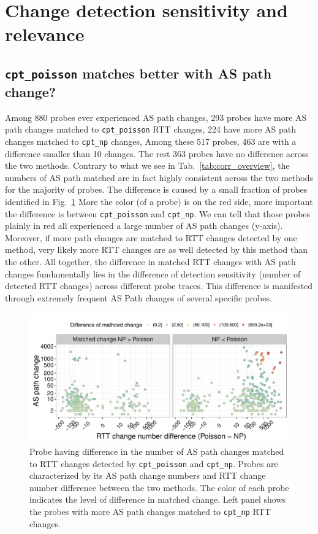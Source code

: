 \section{Change detection sensitivity and relevance}
\subsection{\texttt{cpt\_poisson} matches better with AS path change?}
\label{sec:as_match_diff}
Among 880 probes ever experienced AS path changes, 293 probes have more AS path changes matched to \texttt{cpt\_poisson} RTT changes, 224 have more AS path changes matched to \texttt{cpt\_np} changes, 
Among these 517 probes, 463 are with a difference smaller than 10 changes.
The rest 363 probes have no difference across the two methods.
Contrary to what we see in Tab.~\ref{tab:corr_overview}, the numbers of AS path matched are in fact highly consistent across the two methods for the majority of probes.
The difference is caused by a small fraction of probes identified in Fig.~\ref{fig:as_match_diff}
More the color (of a probe) is on the red side, more important the difference is between \texttt{cpt\_poisson} and \texttt{cpt\_np}.
We can tell that those probes plainly in red all experienced a large number of AS path changes (y-axis).
Moreover, if more path changes are matched to RTT changes detected by one method, very likely more RTT changes are as well detected by this method than the other.
All together, the difference in matched RTT changes with AS path changes fundamentally lies in the difference of detection sensitivity (number of detected RTT changes) across different probe traces. This difference is manifested through extremely frequent AS Path changes of several specific probes.

\begin{figure}[!htb]
\centering
\includegraphics[width=.96\textwidth]{gfx/chap4/as_match_diff.pdf}
\caption{Probe having difference in the number of AS path changes matched to RTT changes detected by \texttt{cpt\_poisson} and \texttt{cpt\_np}. Probes are characterized by its AS path change numbers and RTT change number difference between the two methods. The color of each probe indicates the level of difference in matched change. Left panel shows the probes with more AS path changes matched to \texttt{cpt\_np} RTT changes.}
\label{fig:as_match_diff}
\end{figure}

